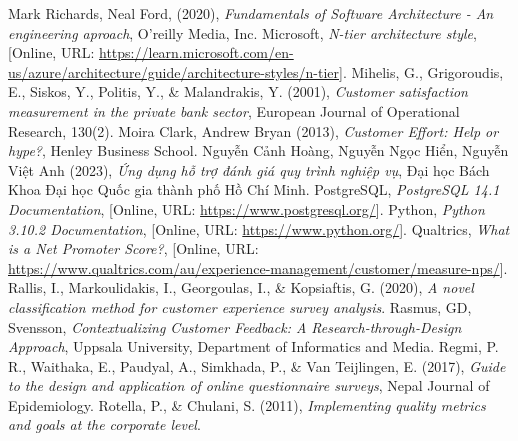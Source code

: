 \begin{thebibliography}{9}
     Mark Richards, Neal Ford, (2020), \textit{Fundamentals of Software Architecture - An engineering aproach}, O’reilly Media, Inc.
     Microsoft, \textit{N-tier architecture style}, [Online, URL: \url{https://learn.microsoft.com/en-us/azure/architecture/guide/architecture-styles/n-tier}].
     Mihelis, G., Grigoroudis, E., Siskos, Y., Politis, Y., \& Malandrakis, Y. (2001), \textit{Customer satisfaction measurement in the private bank sector}, European Journal of Operational Research, 130(2).
     Moira Clark, Andrew Bryan (2013), \textit{Customer Effort: Help or hype?}, Henley Business School.
     Nguyễn Cảnh Hoàng, Nguyễn Ngọc Hiển, Nguyễn Việt Anh (2023), \textit{Ứng dụng hỗ trợ đánh giá quy trình nghiệp vụ}, Đại học Bách Khoa Đại học Quốc gia thành phố Hồ Chí Minh.
     PostgreSQL, \textit{PostgreSQL 14.1 Documentation}, [Online, URL: \url{https://www.postgresql.org/}].
     Python, \textit{Python 3.10.2 Documentation}, [Online, URL: \url{https://www.python.org/}].
     Qualtrics, \textit{What is a Net Promoter Score?}, [Online, URL: \url{https://www.qualtrics.com/au/experience-management/customer/measure-nps/}].
     Rallis, I., Markoulidakis, I., Georgoulas, I., \& Kopsiaftis, G. (2020), \textit{A novel classification method for customer experience survey analysis}.
     Rasmus, GD, Svensson, \textit{Contextualizing Customer Feedback: A Research-through-Design Approach}, Uppsala University, Department of Informatics and Media.
     Regmi, P. R., Waithaka, E., Paudyal, A., Simkhada, P., \& Van Teijlingen, E. (2017), \textit{Guide to the design and application of online questionnaire surveys}, Nepal Journal of Epidemiology.
     Rotella, P., \& Chulani, S. (2011), \textit{Implementing quality metrics and goals at the corporate level}.
\end{thebibliography}